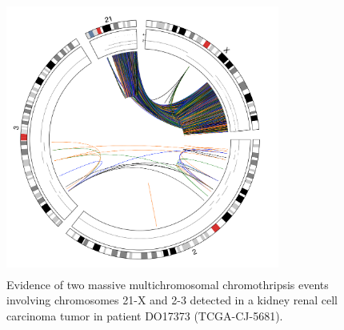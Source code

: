 \documentclass[twoside,a4wide,11pt]{article}\usepackage[]{graphicx}\usepackage[]{color}
\begin{document}
\begin{figure}[!htb]
\begin{center}
\includegraphics[width=9cm,height=9cm]{2939_massive.png}
\caption{Evidence of two massive multichromosomal chromothripsis events involving 
chromosomes 21-X and 2-3 detected in a kidney renal cell carcinoma tumor in patient DO17373 (TCGA-CJ-5681).}
\end{center}
\end{figure}
\end{document}
